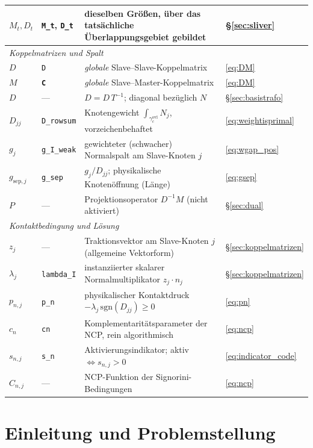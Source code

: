 \documentclass[a4paper,11pt]{article}
\def\bm#1{#1}%
\def\tilde#1{#1}%
\newcommand{\code}[1]{\texttt{\small #1}}
\let\stdsection\section
\renewcommand{\section}{\clearpage\stdsection}
\begin{document}
\begin{center}
\begin{tabularx}{\linewidth}{llXl}
$\bm M_t,\bm D_t$ & \code{M\_t}, \code{D\_t} & dieselben Größen, über das tatsächliche Überlappungsgebiet gebildet & \S\ref{sec:sliver} \\
\midrule
\multicolumn{4}{l}{\emph{Koppelmatrizen und Spalt}}\\
$\bm D$ & \code{D} & \emph{globale} Slave--Slave-Koppelmatrix & \eqref{eq:DM} \\
$\bm M$ & \textbf{\code{C}} & \emph{globale} Slave--Master-Koppelmatrix & \eqref{eq:DM} \\
$\tilde{\bm D}$ & --- & $\bm D=\tilde{\bm D}\,\bm T^{-1}$; diagonal bezüglich $\tilde{\bm N}$ & \S\ref{sec:basistrafo} \\
$\tilde D_{jj}$ & \code{D\_rowsum} & Knotengewicht $\int_{\gamma_c^{\text{ovl}}}\tilde N_j$, vorzeichenbehaftet & \eqref{eq:weightisprimal} \\
$\tilde g_j$ & \code{g\_I\_weak} & gewichteter (schwacher) Normalspalt am Slave-Knoten $j$ & \eqref{eq:wgap_pos} \\
$g_{\text{sep},j}$ & \code{g\_sep} & $\tilde g_j/\tilde D_{jj}$; physikalische Knotenöffnung (Länge) & \eqref{eq:gsep} \\
$\bm P$ & --- & Projektionsoperator $\bm D^{-1}\bm M$ (nicht aktiviert) & \S\ref{sec:dual} \\
\midrule
\multicolumn{4}{l}{\emph{Kontaktbedingung und Lösung}}\\
$\bm z_j$ & --- & Traktionsvektor am Slave-Knoten $j$ (allgemeine Vektorform) & \S\ref{sec:koppelmatrizen} \\
$\lambda_j$ & \code{lambda\_I} & instanziierter skalarer Normalmultiplikator $\bm z_j\!\cdot\!\bm n_j$ & \S\ref{sec:koppelmatrizen} \\
$p_{n,j}$ & \code{p\_n} & physikalischer Kontaktdruck $-\lambda_j\,\mathrm{sgn}(\tilde D_{jj})\ge0$ & \eqref{eq:pn} \\
$c_n$ & \code{cn} & Komplementaritätsparameter der NCP, rein algorithmisch & \eqref{eq:ncp} \\
$s_{n,j}$ & \code{s\_n} & Aktivierungsindikator; aktiv $\iff s_{n,j}>0$ & \eqref{eq:indicator_code} \\
$C_{n,j}$ & --- & NCP-Funktion der Signorini-Bedingungen & \eqref{eq:ncp} \\
\bottomrule
\end{tabularx}
\end{center}

\section{Einleitung und Problemstellung}
\label{sec:einleitung}
\end{document}
